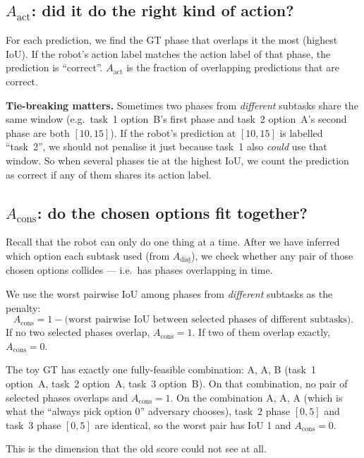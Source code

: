 \documentclass[11pt]{article}
\newcommand{\Adisj}{A_{\text{disj}}}
\newcommand{\Aact}{A_{\text{act}}}
\newcommand{\Acons}{A_{\text{cons}}}
\begin{document}
\subsection{$\Aact$: did it do the right kind of action?}
\label{sec:aact}

For each prediction, we find the GT phase that overlaps it the most
(highest IoU). If the robot's action label matches the action label of
that phase, the prediction is ``correct''. $\Aact$ is the fraction of
overlapping predictions that are correct.

\textbf{Tie-breaking matters.} Sometimes two phases from
\emph{different} subtasks share the same window (e.g.\ task~1
option~B's first phase and task~2 option~A's second phase are both
$[10,15]$). If the robot's prediction at $[10,15]$ is labelled
``task~2'', we should not penalise it just because task~1 also
\emph{could} use that window. So when several phases tie at the
highest IoU, we count the prediction as correct if any of them shares
its action label.

\subsection{$\Acons$: do the chosen options fit together?}
\label{sec:acons}

Recall that the robot can only do one thing at a time. After we have
inferred which option each subtask used (from $\Adisj$), we check
whether any pair of those chosen options collides --- i.e.\ has
phases overlapping in time.

We use the worst pairwise IoU among phases from \emph{different}
subtasks as the penalty:
\begin{equation*}
  \Acons = 1 - \bigl(\text{worst pairwise IoU between selected phases of different subtasks}\bigr).
\end{equation*}
If no two selected phases overlap, $\Acons = 1$. If two of them
overlap exactly, $\Acons = 0$.

\begin{example}
The toy GT has exactly one fully-feasible combination: A, A, B (task~1
option~A, task~2 option~A, task~3 option~B). On that combination, no
pair of selected phases overlaps and $\Acons = 1$. On the combination
A, A, A (which is what the ``always pick option 0'' adversary
chooses), task~2 phase $[0,5]$ and task~3 phase $[0,5]$ are identical,
so the worst pair has IoU 1 and $\Acons = 0$.
\end{example}

This is the dimension that the old score could not see at all.
\end{document}
